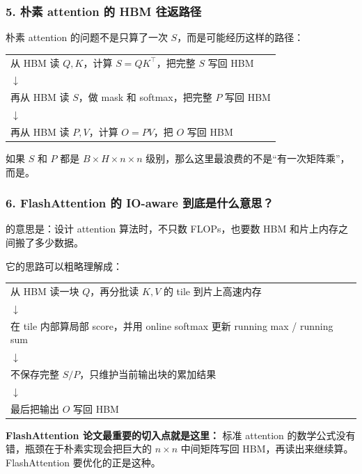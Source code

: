 \subsubsection*{5. 朴素 attention 的 HBM 往返路径}

朴素 attention 的问题不是只算了一次 $S$，而是可能经历这样的路径：

\begin{center}
\begin{tabular}{p{13.2cm}}
\hline
从 HBM 读 $Q,K$，计算 $S=QK^\top$，把完整 $S$ 写回 HBM \\
$\downarrow$ \\
再从 HBM 读 $S$，做 mask 和 softmax，把完整 $P$ 写回 HBM \\
$\downarrow$ \\
再从 HBM 读 $P,V$，计算 $O=PV$，把 $O$ 写回 HBM \\
\hline
\end{tabular}
\end{center}

如果 $S$ 和 $P$ 都是 $B \times H \times n \times n$ 级别，那么这里最浪费的不是“有一次矩阵乘”，而是。

\subsubsection*{6. FlashAttention 的 IO-aware 到底是什么意思？}

 的意思是：设计 attention 算法时，不只数 FLOPs，也要数 HBM 和片上内存之间搬了多少数据。

它的思路可以粗略理解成：

\begin{center}
\begin{tabular}{p{13.2cm}}
\hline
从 HBM 读一块 $Q$，再分批读 $K,V$ 的 tile 到片上高速内存 \\
$\downarrow$ \\
在 tile 内部算局部 score，并用 online softmax 更新 running max / running sum \\
$\downarrow$ \\
不保存完整 $S/P$，只维护当前输出块的累加结果 \\
$\downarrow$ \\
最后把输出 $O$ 写回 HBM \\
\hline
\end{tabular}
\end{center}

\begin{intubox}
\textbf{FlashAttention 论文最重要的切入点就是这里：} 标准 attention 的数学公式没有错，瓶颈在于朴素实现会把巨大的 $n \times n$ 中间矩阵写回 HBM，再读出来继续算。FlashAttention 要优化的正是这种。
\end{intubox}


